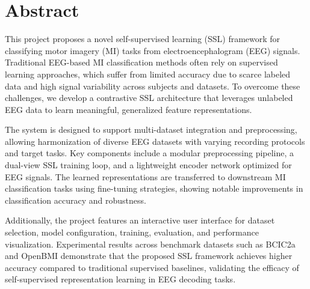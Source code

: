 \chapter*{Abstract}
\label{chap:abstract}

This project proposes a novel self-supervised learning (SSL) framework for classifying motor imagery (MI) tasks from electroencephalogram (EEG) signals. Traditional EEG-based MI classification methods often rely on supervised learning approaches, which suffer from limited accuracy due to scarce labeled data and high signal variability across subjects and datasets. To overcome these challenges, we develop a contrastive SSL architecture that leverages unlabeled EEG data to learn meaningful, generalized feature representations.

The system is designed to support multi-dataset integration and preprocessing, allowing harmonization of diverse EEG datasets with varying recording protocols and target tasks. Key components include a modular preprocessing pipeline, a dual-view SSL training loop, and a lightweight encoder network optimized for EEG signals. The learned representations are transferred to downstream MI classification tasks using fine-tuning strategies, showing notable improvements in classification accuracy and robustness.

Additionally, the project features an interactive user interface for dataset selection, model configuration, training, evaluation, and performance visualization. Experimental results across benchmark datasets such as BCIC2a and OpenBMI demonstrate that the proposed SSL framework achieves higher accuracy compared to traditional supervised baselines, validating the efficacy of self-supervised representation learning in EEG decoding tasks.
